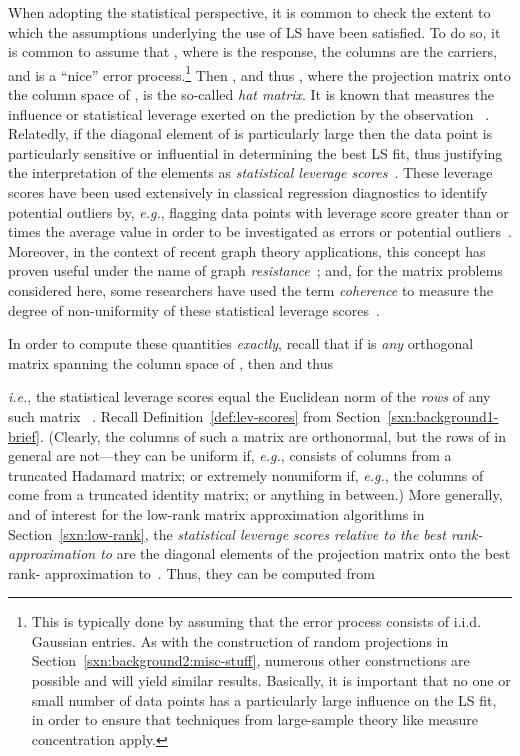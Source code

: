 \documentclass[twoside]{article}
\begin{document}
When adopting the statistical perspective, it is common to check the extent 
to which the assumptions underlying the use of LS have been satisfied.
To do so, it is common to assume that , where  is the 
response, the columns  are the carriers, and  is a 
``nice'' error process.\footnote{This is typically done by assuming that the error process 
 consists of i.i.d. Gaussian entries.  As with the 
construction of random projections in 
Section~\ref{sxn:background2:misc-stuff}, numerous other constructions are 
possible and will yield similar results.  
Basically, it is important that no one or small number of data points has a
particularly large influence on the LS fit, in order to ensure that 
techniques from large-sample theory like measure concentration apply.}
Then , and thus , where the projection 
matrix onto the column space of , 
 is the so-called \emph{hat matrix}.
It is known that  measures the influence or statistical leverage 
exerted on the prediction  by the observation 
~\cite{HW78,ChatterjeeHadi88,CH86,VW81,ChatterjeeHadiPrice00}.
Relatedly, if the  diagonal element of  is particularly large 
then the  data point is particularly sensitive or influential in 
determining the best LS fit, thus justifying the interpretation of the 
elements  as \emph{statistical leverage scores}~\cite{CUR_PNAS}.
These leverage scores have been used extensively in classical 
regression diagnostics to identify potential outliers by, \emph{e.g.}, 
flagging data points with leverage score greater than  or  times the 
average value in order to be investigated as errors or potential 
outliers~\cite{ChatterjeeHadi88}.
Moreover, in the context of recent graph theory applications, this concept 
has proven useful under the name of graph 
\emph{resistance}~\cite{SS08a_STOC}; and, for the matrix problems considered 
here, some researchers have used the term \emph{coherence} to measure the 
degree of non-uniformity of these statistical leverage 
scores~\cite{CR09,TalRos10,MTJ11_TR}.

In order to compute these quantities \emph{exactly}, recall that if  is 
\emph{any} orthogonal matrix spanning the column space of , then 
 and thus 

\emph{i.e.}, the statistical leverage scores equal the Euclidean norm of 
the \emph{rows} of any such matrix ~\cite{DMM08_CURtheory_JRNL,CUR_PNAS}.
Recall Definition~\ref{def:lev-scores} from 
Section~\ref{sxn:background1-brief}.
(Clearly, the columns of such a matrix  are orthonormal, but the rows of 
 in general are not---they can be uniform if, \emph{e.g.},  consists 
of columns from a truncated Hadamard matrix; or extremely nonuniform if, 
\emph{e.g.}, the columns of  come from a truncated identity matrix; or 
anything in between.)
More generally, and of interest for the low-rank matrix approximation 
algorithms in Section~\ref{sxn:low-rank}, the \emph{statistical leverage 
scores relative to the best rank- approximation to } are the diagonal 
elements of the projection matrix onto the best rank- approximation 
to~. 
Thus, they can be computed from 
\end{document}
